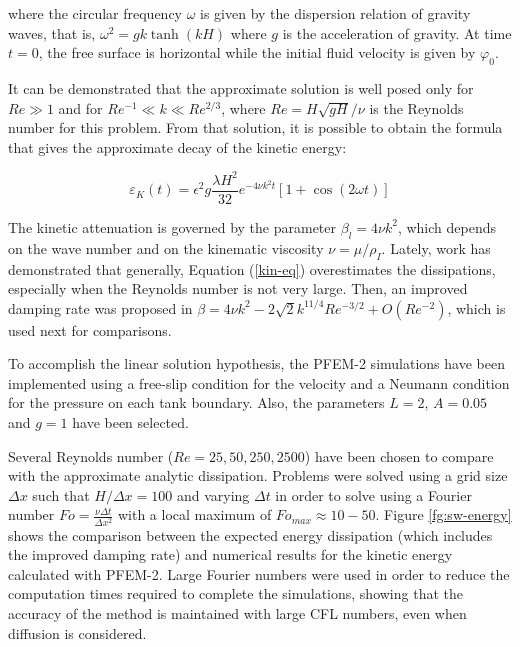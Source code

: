 where the circular frequency $\omega$ is given by the dispersion relation of gravity waves, that is, $\omega^2 = g k \tanh(kH)$ where $g$ is the acceleration of gravity. At time $t = 0$, the free surface is horizontal while the initial fluid velocity is given by $\varphi_0$.

It can be demonstrated that the approximate solution is well posed only for $Re\gg1$ and for $Re^{-1}\ll k \ll Re^{2/3}$, where $Re=H\sqrt{gH}/\nu$ is the Reynolds number for this problem. From that solution, it is possible to obtain the formula that gives the approximate decay of the kinetic energy\cite{Lighthill01}:

\begin{equation}
 \varepsilon_K(t) = \epsilon^2g\frac{\lambda H^2}{32}e^{-4\nu k^2t}\left[1+\cos(2\omega t)\right]
 \label{kin-eq}
\end{equation}

The kinetic attenuation is governed by the parameter $\beta_l = 4\nu k^2$, which depends on the wave number and on the kinematic viscosity $\nu = \mu/\rho_{I}$. Lately, work\cite{Antuono13} has demonstrated that generally, Equation (\ref{kin-eq}) overestimates the dissipations, especially when the Reynolds number is not very large. Then, an improved damping rate was proposed in \cite{Antuono13} $\beta = 4\nu k^2 -  2\sqrt{2}k^{11/4}Re^{-3/2}+O(Re^{-2})$, which is used next for comparisons.

To accomplish the linear solution hypothesis, the PFEM-2 simulations have been implemented using a free-slip condition for the velocity and a Neumann condition for the pressure on each tank boundary. Also, the parameters $L=2$, $A=0.05$ and $g=1$ have been selected.

Several Reynolds number ($Re=25,50,250,2500$) have been chosen to compare with the approximate analytic dissipation. Problems were solved using a grid size $\Delta x$ such that $H/\Delta x=100$ and varying $\Delta t$ in order to solve using a Fourier number $Fo=\frac{\nu\Delta t}{\Delta x^2}$ with a local maximum of $Fo_{max}\approx10-50$. Figure \ref{fg:sw-energy} shows the comparison between the expected energy dissipation (which includes the improved damping rate) and numerical results for the kinetic energy calculated with PFEM-2. Large Fourier numbers were used in order to reduce the computation times required to complete the simulations, showing that the accuracy of the method is maintained with large CFL numbers, even when diffusion is considered.

